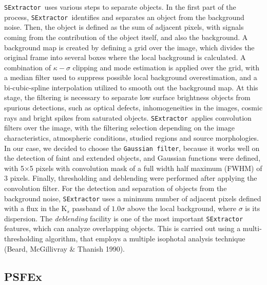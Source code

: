 \documentclass[preprint2]{aastex}
\newcommand{\se}{{\tt SExtractor\ }}
\begin{document}
\se uses various steps to separate objects. In the first part of the process,
\se identifies and 
separates an object from the background noise. Then, the object is defined as 
the 
sum of adjacent pixels, with signals coming from the contribution of the object 
itself, and also the background.
A background map is created by defining a grid over the image, which divides
the original frame into several boxes 
where the local background is calculated. A combination of 
$\kappa-\sigma$ clipping and mode estimation is applied over the grid,
with a median filter used to suppress possible 
local background overestimation, and a bi-cubic-spline interpolation utilized  
to smooth out the background map.  At this stage, the filtering is necessary
to separate low surface 
brightness objects from spurious detections, such as optical defects, 
inhomogeneities in the images, cosmic rays and bright 
spikes from saturated objects. \se applies convolution filters over 
the image, with the filtering selection depending on the 
image characteristics, 
atmospheric conditions, studied regions and source morphologies.
 In our case, we decided to choose the {\tt Gaussian 
filter}, because it works well on the detection 
of faint and extended objects, and Gaussian 
functions were defined, with 5$\times$5 pixels with convolution mask of a full width half maximum 
(FWHM)  of 3 pixels.  Finally, thresholding and deblending were performed after applying the 
convolution filter.  For the detection and separation of objects from the 
background noise,  {\tt SExtractor} uses a minimum number of adjacent pixels 
defined with a flux in the  K$_s$ passband of $1.0 \sigma$ above the local background, where 
$\sigma$ is its dispersion. 
The {\it deblending} facility is one of the most important {\tt SExtractor}
features,
which can analyze overlapping  objects.  This is carried out 
using a multi-thresholding algorithm, that employs a multiple isophotal analysis 
technique (Beard, McGillivray \& Thanish 1990).


\subsection{\bf{PSFEx}}
\end{document}
